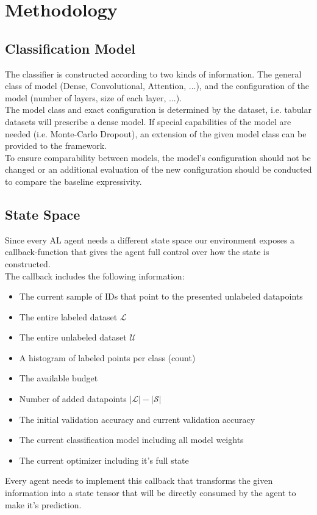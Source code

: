 \documentclass[]{article}
\begin{document}
\section{Methodology}

\subsection{Classification Model}
The classifier is constructed according to two kinds of information.
The general class of model (Dense, Convolutional, Attention, ...), and the configuration of the model (number of layers, size of each layer, ...). \\
The model class and exact configuration is determined by the dataset, i.e. tabular datasets will prescribe a dense model.
If special capabilities of the model are needed (i.e. Monte-Carlo Dropout), an extension of the given model class can be provided to the framework. \\ [1mm]
To ensure comparability between models, the model's configuration should not be changed or an additional evaluation of the new configuration should be conducted to compare the baseline expressivity.

\subsection{State Space}
Since every AL agent needs a different state space our environment exposes a callback-function that gives the agent full control over how the state is constructed. \\ [1mm]
The callback includes the following information:
\begin{itemize}
	\item The current sample of IDs that point to the presented unlabeled datapoints
	\item The entire labeled dataset $\mathcal{L}$
	\item The entire unlabeled dataset $\mathcal{U}$
	\item A histogram of labeled points per class (count)
	\item The available budget
	\item Number of added datapoints $|\mathcal{L}| - |\mathcal{S}|$
	\item The initial validation accuracy and current validation accuracy
	\item The current classification model including all model weights
	\item The current optimizer including it's full state
\end{itemize}
Every agent needs to implement this callback that transforms the given information into a state tensor that will be directly consumed by the agent to make it's prediction.



 
\end{document}
